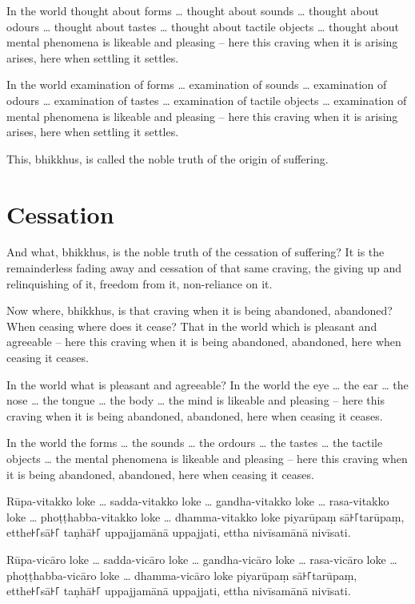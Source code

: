 \englishPage

In the world thought about forms \ldots{} thought about sounds \ldots{} thought
about odours \ldots{} thought about tastes \ldots{} thought about tactile
objects \ldots{} thought about mental phenomena is likeable and pleasing -- here
this craving when it is arising arises, here when settling it settles.

In the world examination of forms \ldots{} examination of sounds \ldots{}
examination of odours \ldots{} examination of tastes \ldots{} examination of
tactile objects \ldots{} examination of mental phenomena is likeable and
pleasing -- here this craving when it is arising arises, here when settling it
settles.

This, bhikkhus, is called the noble truth of the origin of suffering.

\section{Cessation}

And what, bhikkhus, is the noble truth of the cessation of suffering? It is the
remainderless fading away and cessation of that same craving, the giving up and
relinquishing of it, freedom from it, non-reliance on it.

Now where, bhikkhus, is that craving when it is being abandoned, abandoned? When
ceasing where does it cease? That in the world which is pleasant and agreeable
-- here this craving when it is being abandoned, abandoned, here when ceasing it
ceases.

In the world what is pleasant and agreeable? In the world the eye \ldots{} the
ear \ldots{} the nose \ldots{} the tongue \ldots{} the body \ldots{} the mind is
likeable and pleasing -- here this craving when it is being abandoned, abandoned,
here when ceasing it ceases.

In the world the forms \ldots{} the sounds \ldots{} the ordours \ldots{} the
tastes \ldots{} the tactile objects \ldots{} the mental phenomena is likeable
and pleasing -- here this craving when it is being abandoned, abandoned, here
when ceasing it ceases.

\paliPage

Rūpa-vitakko loke \ldots{} sadda-vitakko loke \ldots{} gandha-vitakko loke \ldots{}
rasa-vitakko loke \ldots{} phoṭṭhabba-vitakko loke \ldots{} dhamma-vitakko loke
piyarūpaṃ sā꜔꜒tarūpaṃ, etthe꜔꜒sā꜔꜒ taṇhā꜔꜒ uppajjamānā uppajjati, ettha nivīsamānā
nivīsati.

Rūpa-vicāro loke \ldots{} sadda-vicāro loke \ldots{} gandha-vicāro loke \ldots{}
rasa-vicāro loke \ldots{} phoṭṭhabba-vicāro loke \ldots{} dhamma-vicāro loke
piyarūpaṃ sā꜔꜒tarūpaṃ, etthe꜔꜒sā꜔꜒ taṇhā꜔꜒ uppajjamānā uppajjati, ettha nivīsamānā
nivīsati.

